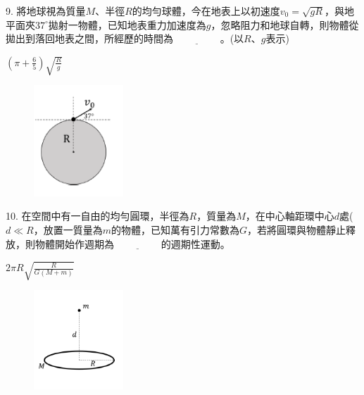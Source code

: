\documentclass[cn,10pt,math=newtx,chinesefont=founder,device=ig]{elegantbook}
\begin{document}
\begin{example}
   9. 將地球視為質量$M$、半徑$R$的均勻球體，今在地表上以初速度$v_0=\sqrt{gR}$，與地平面夾$37^\circ$拋射一物體，已知地表重力加速度為$g$，忽略阻力和地球自轉，則物體從拋出到落回地表之間，所經歷的時間為$\underline{\hspace{2cm}}$。(以$R$、$g$表示)\\
    \rightline{[桃園高中教甄109]}
\end{example}
\begin{solution}
    $(\pi+\frac{6}{5}) \sqrt{\frac{R}{g}}$
\end{solution}
\begin{figure}[htbp]
    \flushright
    \includegraphics[width=0.3\textwidth]{image/109桃園9.png}
  \end{figure}
\newpage

\begin{example}
   10. 在空間中有一自由的均勻圓環，半徑為$R$，質量為$M$，在中心軸距環中心$d$處($d\ll R$，放置一質量為$m$的物體，已知萬有引力常數為$G$，若將圓環與物體靜止釋放，則物體開始作週期為$\underline{\hspace{2cm}}$的週期性運動。\\
    \rightline{[桃園高中教甄109]}
\end{example}
\begin{solution}
    $2\pi R \sqrt{\frac{R}{G(M+m)}}$
\end{solution}
\begin{figure}[htbp]
    \flushright
    \includegraphics[width=0.3\textwidth]{image/109桃園10.png}
  \end{figure}
\newpage
\end{document}
